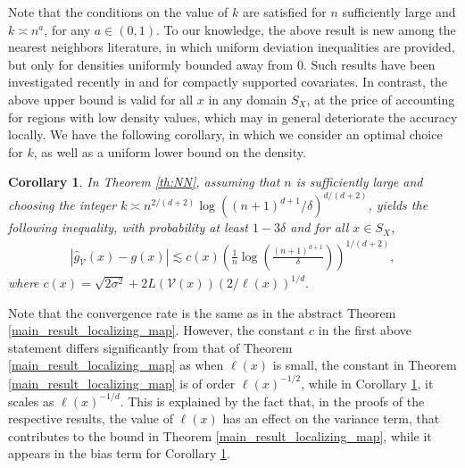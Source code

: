 \documentclass[paper=a4, fontsize=11pt]{scrartcl}
\newtheorem{corollary}[theorem]{Corollary}
\begin{document}
Note that the conditions on the value of $k$ are satisfied for $n$ sufficiently large   and $k\asymp n^a $, for any $a\in (0,1)$. 
To our knowledge, the above result is new among the nearest neighbors literature, in which uniform deviation inequalities are provided, but only for densities uniformly bounded away from $0$. Such results have been investigated recently in \cite{jiang2019non} and \cite{portier2021nearest} for compactly supported covariates. In contrast, the above upper bound is valid for all $x$ in any domain $S_X$, at the price of accounting for regions with low density values, which may in general deteriorate the accuracy locally. We have the following corollary, in which we consider an optimal choice for $k$, as well as a uniform lower bound on the density.


\begin{corollary}\label{corknn}
In Theorem \ref{th:NN}, assuming that $ n $ is sufficiently large and choosing the integer $k \asymp n^{2/(d+2)} \log((n+1)^{d+1}/\delta)^{d/(d+2)}$, yields the following inequality, with probability at least $1-3\delta$ and for all $x\in S_X$, 
   \begin{align*}
      |\hat g_{\mathcal V}(x) - g(x) |  \lesssim c(x) \left( \frac{1}{n} \log \left( \frac{(n+1)^{d+1}}{\delta }\right) \right)^{1/(d+2)},
   \end{align*}
    where $c(x) =   \sqrt{2\sigma^2} + 2 L(\mathcal{V}(x)) \left({2}/\ell(x) \right)^{1/d}.$  
\end{corollary}


Note that the convergence rate is the same as in the abstract Theorem \ref{main_result_localizing_map}. However, the constant $c$ in the first above statement differs significantly from that of Theorem  \ref{main_result_localizing_map} as when $\ell(x)$ is small, the constant in Theorem \ref{main_result_localizing_map} is of order \( { \ell(x) } ^{-1/2} \), while in Corollary \ref{corknn}, it scales as \(  \ell(x) ^{-1/d} \). This is explained by the fact that, in the proofs of the respective results, the value of $\ell(x)$ has an effect on the variance term, that contributes to the bound in Theorem \ref{main_result_localizing_map}, while it appears in the bias term for Corollary \ref{corknn}. 
\end{document}
